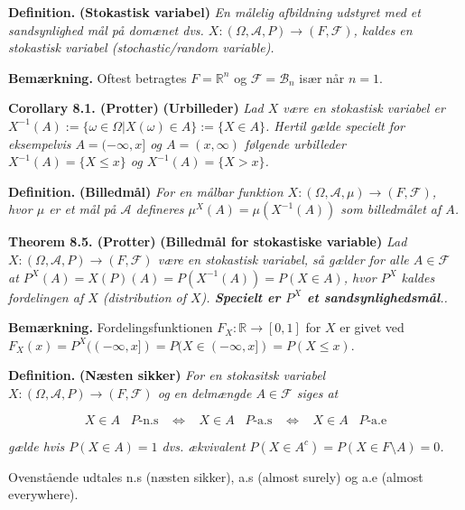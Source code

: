 \documentclass[a4paper,12pt,openany]{book}
\begin{document}
\textbf{Definition.} \textbf{(Stokastisk variabel)} \emph{En målelig afbildning udstyret med et sandsynlighed mål på domænet dvs. \(X : (\Omega,\mathcal{A},P) \to (F,\mathcal{F})\), kaldes en stokastisk variabel (stochastic/random variable).}

\textbf{Bemærkning.} Oftest betragtes \(F=\mathbb{R}^n\) og \(\mathcal{F}=\mathcal{B}_n\) især når \(n=1\).

\textbf{Corollary 8.1. (Protter)} \textbf{(Urbilleder)} \emph{Lad \(X\) være en stokastisk variabel er \(X^{-1}(A):=\{\omega\in\Omega \vert X(\omega)\in A\}:=\{X\in A\}\). Hertil gælde specielt for eksempelvis \(A=(-\infty,x]\) og \(A=(x,\infty)\) følgende urbilleder \(X^{-1}(A)=\{X\le x\}\) og \(X^{-1}(A)=\{X> x\}\).}

\textbf{Definition.} \textbf{(Billedmål)} \emph{For en målbar funktion \(X : (\Omega,\mathcal{A},\mu) \to (F,\mathcal{F})\), hvor \(\mu\) er et mål på \(\mathcal{A}\) defineres \(\mu^X(A)=\mu(X^{-1}(A))\) som billedmålet af \(A\).}

\textbf{Theorem 8.5. (Protter)} \textbf{(Billedmål for stokastiske variable)} \emph{Lad \(X : (\Omega,\mathcal{A},P) \to (F,\mathcal{F})\) være en stokastisk variabel, så gælder for alle \(A\in\mathcal{F}\) at \(P^X(A)=X(P)(A)=P(X^{-1}(A))=P(X\in A)\), hvor \(P^X\) kaldes fordelingen af \(X\) (distribution of \(X\)). \textbf{Specielt er \(P^X\) et sandsynlighedsmål}..}

\textbf{Bemærkning.} Fordelingsfunktionen \(F_X: \mathbb{R}\to [0,1]\) for \(X\) er givet ved \(F_X(x)=P^X((-\infty,x])=P(X\in (-\infty,x])=P(X\le x)\).

\textbf{Definition.} \textbf{(Næsten sikker)} \emph{For en stokasitsk variabel \(X:(\Omega,\mathcal{A},P) \to (F,\mathcal{F})\) og en delmængde \(A\in \mathcal{F}\) siges at}

\[
X\in A\hspace{10pt} P\text{-n.s}\hspace{10pt}\Leftrightarrow\hspace{10pt} X\in A\hspace{10pt} P\text{-a.s}\hspace{10pt}\Leftrightarrow\hspace{10pt} X\in A\hspace{10pt} P\text{-a.e}
\]

\emph{gælde hvis \(P(X\in A)=1\) dvs. ækvivalent \(P(X\in A^c)=P(X\in F\setminus A)=0\).}

Ovenstående udtales n.s (næsten sikker), a.s (almost surely) og a.e (almost everywhere).
\end{document}
